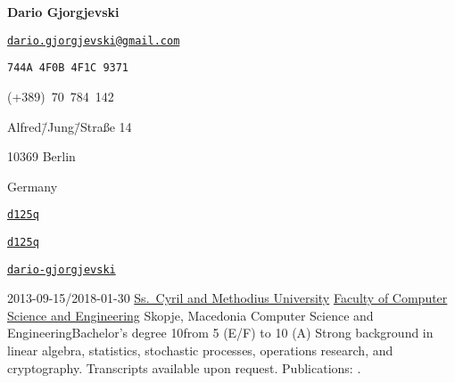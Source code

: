 \documentclass[version=last, fontsize=10pt, paper=A4, toc=bibliography]{scrartcl}%
\begin{document}
\begin{center}
  \huge\bfseries Dario Gjorgjevski
\end{center}

\begin{minipage}[t]{.35\columnwidth}
  \begin{description}[noitemsep, leftmargin=*, widest=\faInbox]
  \item[\faInbox] \href{mailto:dario.gjorgjevski@gmail.com}%
    {\nolinkurl{dario.gjorgjevski@gmail.com}}
  \item[\faKey] \Verb+744A 4F0B 4F1C 9371+
  \item[\faPhone] (+389)~70~784~142
  \end{description}
\end{minipage}
\begin{minipage}[t]{.30\columnwidth}
  \begin{description}[noitemsep, leftmargin=*, widest=\faHome]
  \item[\faHome] Alfred\=/Jung\=/Straße 14
  \item 10369 Berlin
  \item Germany
  \end{description}
\end{minipage}%
\begin{minipage}[t]{.30\columnwidth}
  \begin{description}[noitemsep, leftmargin=*, widest=\faGithub]
  \item[\faGithub] \href{https://github.com/d125q}{\nolinkurl{d125q}}
  \item[\faStackExchange]
    \href{https://stackexchange.com/users/3671527/d125q}%
    {\nolinkurl{d125q}}
  \item[\faLinkedin] \href{https://www.linkedin.com/in/dario-gjorgjevski/}%
    {\nolinkurl{dario-gjorgjevski}}
  \end{description}
\end{minipage}

\label{sec:education}

\EducationEntry%
{2013-09-15/2018-01-30}%
{\href{http://ukim.edu.mk/}{Ss.\ Cyril and Methodius University}}%
{\href{https://finki.ukim.mk/}{Faculty of Computer Science and Engineering}}%
{Skopje, Macedonia}%
{Computer Science and Engineering}{Bachelor's degree}%
{10}{from 5 (E/F) to 10 (A)}%
{%
  Strong background in linear algebra, statistics, stochastic processes,
  operations research, and cryptography.  Transcripts available upon request.
  Publications: \autocites{Gjorgjevski:Combining_LWE-Solving_Algorithms,
    Gjorgjevski:ECC_in_the_Rank_Metric,
    Gjorgjevski:Using_Distributed_Representations}.%
}
\end{document}
